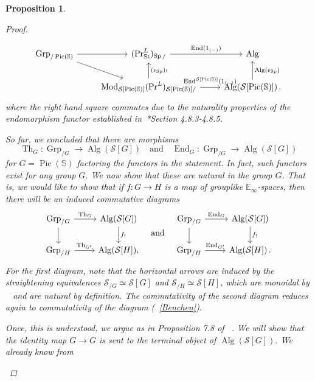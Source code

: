 \documentclass[10pt]{amsart}
\newcommand{\longto}{\longrightarrow}
\theoremstyle{plain}
\newtheorem{proposition}[theorem]{Proposition}
\theoremstyle{definition}
\DeclareMathOperator{\Mod}{Mod}
\DeclareMathOperator{\End}{End}
\DeclareMathOperator{\Grp}{Grp}
\DeclareMathOperator{\Sp}{Sp}
\DeclareMathOperator{\Th}{Th}
\DeclareMathOperator{\Pic}{Pic}
\DeclareMathOperator{\Alg}{Alg}
\def\on{\operatorname}
\newcommand{\St}{\mathrm{St}}
\newcommand{\bE}{\mathbb{E}}
\newcommand{\bS}{\mathbb{S}}
\newcommand{\cS}{\mathcal{S}}
\newcommand{\och}{\quad \text{and} \quad}
\begin{document}
\begin{proposition}
\begin{proof}
\begin{description}
      \begin{equation} \label{Benchen}
      \begin{tikzcd}
        \Grp_{/\Pic(\bS)} \arrow[r] \arrow[dr] & (\mathrm{Pr}^{L}_{\St})_{\Sp /} \arrow[r,"\End(1_{(-)})"] & \Alg \\
        & \Mod_{\cS[\Pic(\bS)]}(\mathrm{Pr}^L)_{\cS[\Pic(\bS)]/} \arrow[r,"\End^{\cS[\Pic(\bS)]}(1_{(-)})"] \arrow[u,"(\epsilon_{\Sp})_!"'] & \Alg(\cS[\Pic(\bS)]) \arrow[u,"\Alg(\epsilon_{\Sp})"'] \,.
      \end{tikzcd}
      \end{equation}
      where the right hand square commutes due to the naturality properties of the endomorphism functor established in~\cite{HA}*{Section 4.8.3-4.8.5}.
      \item[Step 2] So far, we concluded that there are morphisms
      \[
      \Th_G : \Grp_{/G} \longto \Alg(\cS[G]) \och \End_G : \Grp_{/G} \longto \Alg(\cS[G])
      \]
      for $G = \Pic(\bS)$ factoring the functors in the statement.
      In fact, such functors exist for any group $G$.
      We now show that these are natural in the group $G$.
      That is, we would like to show that if $f: G \to H$ is a map of grouplike $\bE_{\infty}$-spaces, then
      there will be an induced commutative diagrams
        \[
          \begin{tikzcd}
            \on{Grp}_{/G} \arrow[r,"\Th_{G}"] \arrow[d] & \Alg(\cS[G]) \arrow[d, "f_!"] \\
            \on{Grp}_{/H} \arrow[r,"\Th_{G'}"] & \Alg(\cS[H]),
          \end{tikzcd}
          \och
          \begin{tikzcd}
            \on{Grp}_{/G} \arrow[r,"\End_{G}"] \arrow[d] & \Alg(\cS[G]) \arrow[d, "f_!"] \\
            \on{Grp}_{/H} \arrow[r,"\End_{G'}"] & \Alg(\cS[H]) \,.
          \end{tikzcd}
          \]
      For the first diagram, note that     the horizontal arrows are induced by the straightening equivalences $\cS_{/G} \simeq \cS[G]$ and $\cS_{/H} \simeq \cS[H]$, which are monoidal by ~\cite[Corollary D]{ramzi} and are natural by definition. The commutativity of the second diagram reduces again to commutativity of the diagram (~\ref{Benchen}).
      \item[Step 3] Once, this is understood, we argue as in Proposition 7.8 of ~\cite{CCRY23}. We will show that the identity map $G \to G$ is sent to the terminal object of  $\Alg(\cS[G])$. We already know from ~\cite[Theorem 7.13]{CCRY23}

\end{description}
\end{proof}
\end{proposition}
\end{document}
